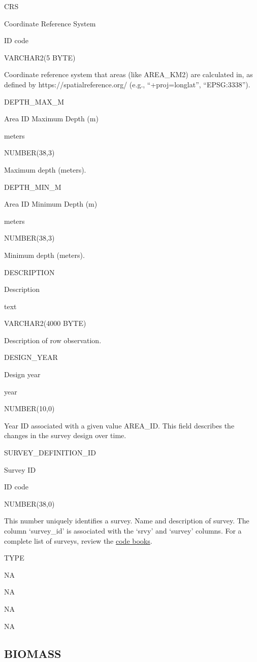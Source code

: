 \documentclass[
  letterpaper,
  oneside,
  open=any]{scrbook}
\begin{document}
CRS

Coordinate Reference System

ID code

VARCHAR2(5 BYTE)

Coordinate reference system that areas (like AREA\_KM2) are calculated
in, as defined by https://spatialreference.org/ (e.g.,
``+proj=longlat'', ``EPSG:3338'').

DEPTH\_MAX\_M

Area ID Maximum Depth (m)

meters

NUMBER(38,3)

Maximum depth (meters).

DEPTH\_MIN\_M

Area ID Minimum Depth (m)

meters

NUMBER(38,3)

Minimum depth (meters).

DESCRIPTION

Description

text

VARCHAR2(4000 BYTE)

Description of row observation.

DESIGN\_YEAR

Design year

year

NUMBER(10,0)

Year ID associated with a given value AREA\_ID. This field describes the
changes in the survey design over time.

SURVEY\_DEFINITION\_ID

Survey ID

ID code

NUMBER(38,0)

This number uniquely identifies a survey. Name and description of
survey. The column `survey\_id' is associated with the `srvy' and
`survey' columns. For a complete list of surveys, review the
\href{https://www.fisheries.noaa.gov/resource/document/groundfish-survey-species-code-manual-and-data-codes-manual}{code
books}.

TYPE

NA

NA

NA

NA

\hypertarget{biomass}{%
\subsection{BIOMASS}\label{biomass}}
\end{document}
